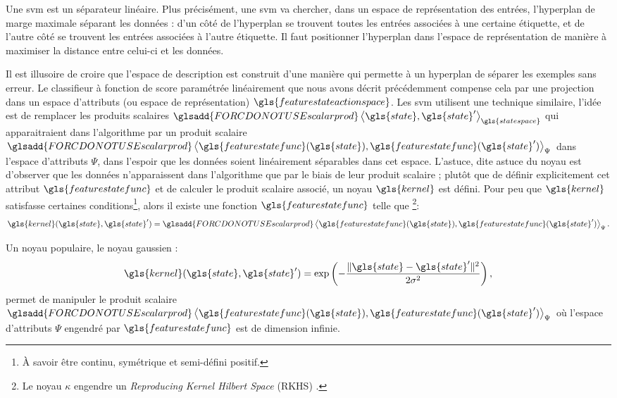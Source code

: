 \documentclass[frenchb,a4paper,justified,notoc]{tufte-book}
\newcommand{\featurestatefunc}{\gls{featurestatefunc}}
\newcommand{\kernel}{\gls{kernel}}
\newcommand{\state}{\gls{state}}
\newcommand{\statespace}{\gls{statespace}}
\newcommand{\featurestateactionspace}{\gls{featurestateactionspace}}
\newcommand{\scalarprod}[2]{\ensuremath{\glsadd{FORCDONOTUSEscalarprod}\left\langle{#1} , {#2}\right\rangle}}
\begin{document}
    Une \gls{svm} est un séparateur linéaire. Plus précisément, une \gls{svm} va chercher, dans un espace de représentation des entrées, l'hyperplan de marge maximale séparant les données : d'un côté de l'hyperplan se trouvent toutes les entrées associées à une certaine étiquette, et de l'autre côté se trouvent les entrées associées à l'autre étiquette. Il faut positionner l'hyperplan dans l'espace de représentation de manière à maximiser la distance entre celui-ci et les données.

    Il est illusoire de croire que l'espace de description est construit d'une manière qui permette à un hyperplan de séparer les exemples sans erreur. Le classifieur à fonction de score paramétrée linéairement que nous avons décrit précédemment compense cela par une projection dans un espace d'attributs (ou espace de représentation) $\featurestateactionspace$. Les \gls{svm} utilisent une technique similaire, l'idée est de remplacer les produits scalaires $\scalarprod{\state}{\state'}_{\statespace}$ qui apparaitraient dans l'algorithme par un produit scalaire $\scalarprod{\featurestatefunc(\state)}{\featurestatefunc(\state')}_{\Psi}$ dans l'espace d'attributs $\Psi$, dans l'espoir que les données soient linéairement séparables dans cet espace. L'astuce, dite astuce du noyau \citep{aizerman1964theoretical,boser1992training} est d'observer que les données n'apparaissent dans l'algorithme que par le biais de leur produit scalaire ; plutôt que de définir explicitement cet attribut $\featurestatefunc$ et de calculer le produit scalaire associé, un noyau $\kernel$ est défini. Pour peu que $\kernel$ satisfasse certaines conditions\footnote{\`A savoir être continu, symétrique et semi-défini positif.
 }, alors il existe \citep{mercer1909functions,berlinet2004reproducing} une fonction $\featurestatefunc$ telle que \footnote{Le noyau $\kappa$ engendre un \emph{Reproducing Kernel Hilbert Space} (RKHS) \citep{berlinet2004reproducing}.
 }:
\begin{equation}
\kernel(\state,\state') = \scalarprod{\featurestatefunc(\state)}{\featurestatefunc(\state')}_{\Psi}.
\end{equation} 

Un noyau populaire, le noyau gaussien :
\begin{equation}
\kernel(\state,\state')=\exp\left(- \frac{\|\state - \state'\|^2}{2 \sigma^2}\right),
\end{equation}
permet de manipuler le produit scalaire $\scalarprod{\featurestatefunc(\state)}{\featurestatefunc(\state')}_\Psi$ où  l'espace d'attributs $\Psi$ engendré par $\featurestatefunc$ est de dimension infinie.
\end{document}
